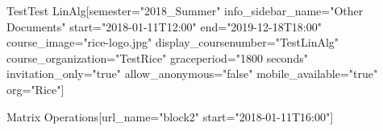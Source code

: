 \documentclass[12pt]{article}
\begin{document}


\def\defaultproblemattributes{attempts="1" showanswer="attempted" rerandomize="per_student"}

\begin{edXcourse}{Test}{Test LinAlg}[semester="2018_Summer" info_sidebar_name="Other Documents" start="2018-01-11T12:00" end="2019-12-18T18:00" course_image="rice-logo.jpg" display_coursenumber="TestLinAlg" course_organization="TestRice" graceperiod="1800 seconds" invitation_only="true" allow_anonymous="false" mobile_available="true"  org="Rice"]
 
%  


% 
 

 




\begin{edXchapter}{Matrix Operations}[url_name="block2" start="2018-01-11T16:00"]

\def\edxbaseoutputname{b2matrixmult}







% 







\def\edxbaseoutputname{b2matrixinv}









% 




\endedxsequential






\end{edXchapter}
\end{edXcourse}
\end{document}
